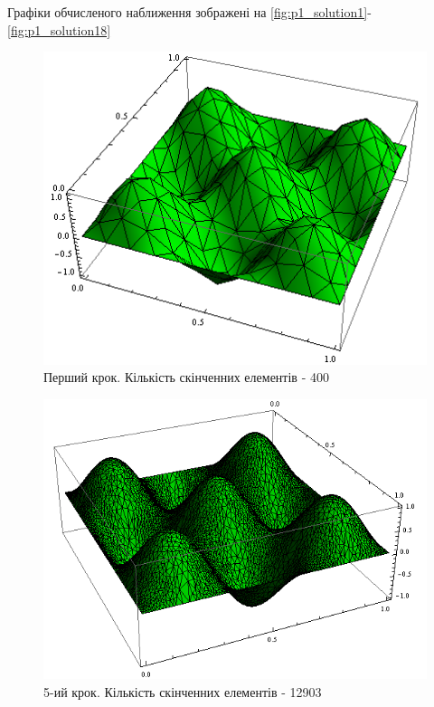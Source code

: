 Графіки обчисленого наближення зображені на \autoref{fig:p1_solution1}-\ref{fig:p1_solution18}
%
\begin{figure}[H]
	\centering
    \includegraphics[scale=0.9]{problem1/my/solutions/1}
    \caption{Перший крок. Кількість скінченних елементів - 400}
    \label{fig:p1_solution1}
\end{figure}
%
\begin{figure}[H]
	\centering
    \includegraphics[scale=0.7]{problem1/my/solutions/5}
    \caption{5-ий крок. Кількість скінченних елементів - 12903}
    \label{fig:p1_solution5}
\end{figure}
%

